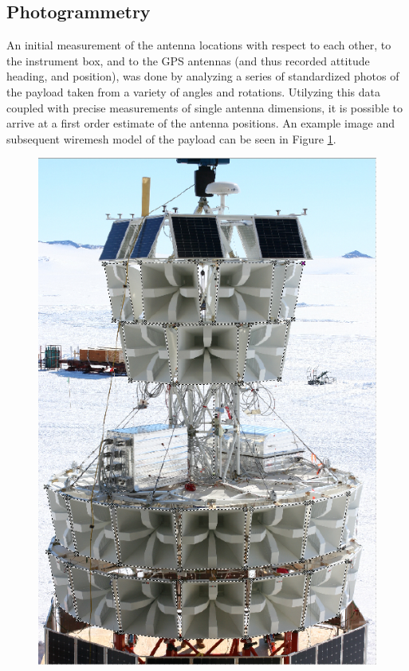 	\subsection{Photogrammetry}
		An initial measurement of the antenna locations with respect to each other, to the instrument box, and to the GPS antennas (and thus recorded attitude heading, and position), was done by analyzing a series of standardized photos of the payload taken from a variety of angles and rotations.  Utilyzing this data coupled with precise measurements of single antenna dimensions, it is possible to arrive at a first order estimate of the antenna positions.  An example image and subsequent wiremesh model of the payload can be seen in Figure \ref{fig:photogram1}.
		
	\begin{figure}
	\label{fig:photogram1}
		\centering
		\includegraphics[height=0.5\textheight]{figures/KBelovANITA-III_photogrammetry_update-3}

\end{figure}
